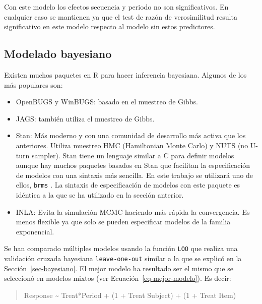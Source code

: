 \documentclass[
  12pt,
  a4paper,
  extrafontsizes,
  onecolumn,
  openright,
  table]{memoir}
\providecommand{\tightlist}{%
  \setlength{\itemsep}{0pt}\setlength{\parskip}{0pt}}\usepackage{longtable,booktabs,array}
\begin{document}
\normalsize

Con este modelo los efectos secuencia y periodo no son significativos.
En cualquier caso se mantienen ya que el test de razón de verosimilitud
resulta significativo en este modelo respecto al modelo sin estos
predictores.

\hypertarget{sec-bayesiano-2}{%
\subsection{Modelado bayesiano}\label{sec-bayesiano-2}}

Existen muchos paquetes en R para hacer inferencia bayesiana. Algunos de
los más populares son:

\begin{itemize}
\tightlist
\item
  OpenBUGS y WinBUGS: basado en el muestreo de Gibbs.
\item
  JAGS: también utiliza el muestreo de Gibbs.
\item
  Stan: Más moderno y con una comunidad de desarrollo más activa que los
  anteriores. Utiliza muestreo HMC (Hamiltonian Monte Carlo) y NUTS (no
  U-turn sampler). Stan tiene un lenguaje similar a C para definir
  modelos aunque hay muchos paquetes basados en Stan que facilitan la
  especificación de modelos con una sintaxis más sencilla. En este
  trabajo se utilizará uno de ellos, \texttt{brms}
  \autocite[ver][]{brms} . La sintaxis de especificación de modelos con
  este paquete es idéntica a la que se ha utilizado en la sección
  anterior.
\item
  INLA: Evita la simulación MCMC haciendo más rápida la convergencia. Es
  menos flexible ya que solo se pueden especificar modelos de la familia
  exponencial.
\end{itemize}

Se han comparado múltiples modelos usando la función \texttt{LOO} que
realiza una validación cruzada bayesiana \texttt{leave-one-out} similar
a la que se explicó en la Sección~\ref{sec-bayesiano}. El mejor modelo
ha resultado ser el mismo que se seleccionó en modelos mixtos (ver
Ecuación~\ref{eq-mejor-modelo}). Es decir:

\small

\begin{quote}
Response \textasciitilde{} Treat*Period + (1 + Treat \textbar{} Subject)
+ (1 + Treat \textbar{} Item) \normalsize
\end{quote}

\scriptsize
\end{document}

